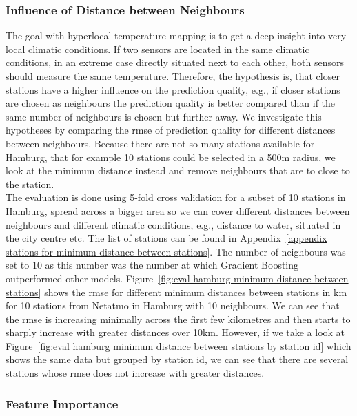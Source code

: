 \subsubsection{Influence of Distance between Neighbours}

The goal with hyperlocal temperature mapping is to get a deep insight into very local climatic conditions. If two sensors are located in the same climatic conditions, in an extreme case directly situated next to each other, both sensors should measure the same temperature. Therefore, the hypothesis is, that closer stations have a higher influence on the prediction quality, e.g., if closer stations are chosen as neighbours the prediction quality is better compared than if the same number of neighbours is chosen but further away. We investigate this hypotheses by comparing the \gls{rmse} of prediction quality for different distances between neighbours. Because there are not so many stations available for Hamburg, that for example 10 stations could be selected in a 500m radius, we look at the minimum distance instead and remove neighbours that are to close to the station.\\
The evaluation is done using 5-fold cross validation for a subset of 10 stations in Hamburg, spread across a bigger area so we can cover different distances between neighbours and different climatic conditions, e.g., distance to water, situated in the city centre etc. The list of stations can be found in Appendix~\ref{appendix stations for minimum distance between stations}. The number of neighbours was set to 10 as this number was the number at which Gradient Boosting outperformed other models. Figure~\ref{fig:eval hamburg minimum distance between stations} shows the \gls{rmse} for different minimum distances between stations in km for 10 stations from Netatmo in Hamburg with 10 neighbours. We can see that the \gls{rmse} is increasing minimally across the first few kilometres and then starts to sharply increase with greater distances over 10km. However, if we take a look at Figure~\ref{fig:eval hamburg minimum distance between stations by station id} which shows the same data but grouped by station id, we can see that there are several stations whose \gls{rmse} does not increase with greater distances.\\

\subsubsection{Feature Importance}


